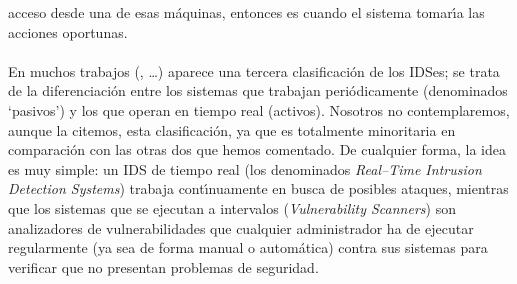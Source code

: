 acceso desde una de esas m\'aquinas, entonces es cuando el sistema tomar\'{\i}a 
las acciones oportunas.\\
\\En muchos trabajos (\cite{kn:esc98}, \cite{kn:thu00}\ldots) aparece una 
tercera clasificaci\'on de los IDSes; se trata de la diferenciaci\'on entre los 
sistemas que trabajan peri\'odicamente (denominados `pasivos') y los que operan 
en tiempo real (activos). Nosotros no 
contemplaremos, aunque la citemos, esta clasificaci\'on, ya que es totalmente
minoritaria en comparaci\'on con las otras dos que hemos comentado. De
cualquier forma, la idea es muy simple: un IDS de tiempo real (los denominados
{\it Real--Time Intrusion Detection Systems}) trabaja cont\'{\i}nuamente en
busca de posibles ataques, mientras que los sistemas que se ejecutan a 
intervalos ({\it Vulnerability Scanners}) son analizadores de vulnerabilidades
que cualquier administrador ha de ejecutar regularmente (ya sea de forma 
manual o autom\'atica) contra sus sistemas para verificar que no presentan 
problemas de seguridad.
